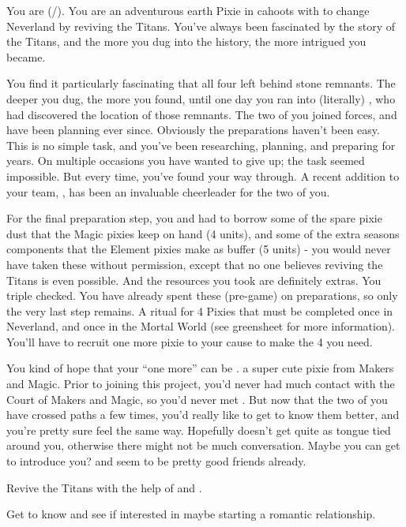 \documentclass[char]{PP}
\begin{document}
\name{\cETitan{}}

You are \cETitan{} (\cETitan{\They}/\cETitan{\Them}). You are an adventurous earth Pixie in cahoots with \cFTitan{} to change Neverland by reviving the Titans. You’ve always been fascinated by the story of the Titans, and the more you dug into the history, the more intrigued you became. 

You find it particularly fascinating that all four left behind stone remnants. The deeper you dug, the more you found, until one day you ran into (literally) \cFTitan{}, who had discovered the location of those remnants. The two of you joined forces, and have been planning ever since. Obviously the preparations haven’t been easy. This is no simple task, and you’ve been researching, planning, and preparing for years. On multiple occasions you have wanted to give up; the task seemed impossible. But every time, you’ve found your way through. A recent addition to your team, \cEAirship{}, has been an invaluable cheerleader for the two of you.

For the final preparation step, you and \cETitan{} had to borrow some of the spare pixie dust that the Magic pixies keep on hand (4 units), and some of the extra seasons components that the Element pixies make as buffer (5 units) - you would never have taken these without permission, except that no one believes reviving the Titans is even possible. And the resources you took are definitely extras. You triple checked. You have already spent these (pre-game) on preparations, so only the very last step remains. A ritual for 4 Pixies that must be completed once in Neverland, and once in the Mortal World (see greensheet for more information). You’ll have to recruit one more pixie to your cause to make the 4 you need.

You kind of hope that your “one more” can be \cMAirship{}. \cMAirship{\They} \cMAirship{\are} a super cute pixie from Makers and Magic. Prior to \cEAirship{} joining this project, you’d never had much contact with the Court of Makers and Magic, so you’d never met \cMAirship{}. But now that the two of you have crossed paths a few times, you’d really like to get to know them better, and you’re pretty sure \cMAirship{\they} feel\cMAirship{\plural} the same way. Hopefully \cMAirship{} doesn’t get quite as tongue tied around you, otherwise there might not be much conversation. Maybe you can get \cEAirship{} to introduce you? \cEAirship{} and \cMAirship{} seem to be pretty good friends already.
 

\begin{itemz}
	\item Revive the Titans with the help of \cFTitan{} and \cEAirship{}.
	\item Get to know \cMAirship{} and see if \cMAirship{\they} \cMAirship{\are} interested in maybe starting a romantic relationship.
\end{itemz}
\end{document}
